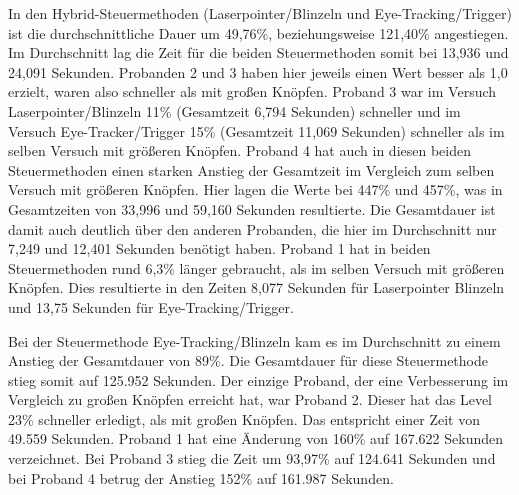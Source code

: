 In den Hybrid-Steuermethoden (Laserpointer/Blinzeln und Eye-Tracking/Trigger) ist die durchschnittliche Dauer um 49,76\%, beziehungsweise 121,40\% angestiegen. Im Durchschnitt lag die Zeit für die beiden Steuermethoden somit bei 13,936  und 24,091 Sekunden. Probanden 2 und 3 haben hier jeweils einen Wert besser als 1,0 erzielt, waren also schneller als mit großen Knöpfen. Proband 3 war im Versuch Laserpointer/Blinzeln 11\% (Gesamtzeit 6,794 Sekunden) schneller und im Versuch Eye-Tracker/Trigger 15\% (Gesamtzeit 11,069 Sekunden) schneller als im selben Versuch mit größeren Knöpfen. Proband 4 hat auch in diesen beiden Steuermethoden einen starken Anstieg der Gesamtzeit im Vergleich zum selben Versuch mit größeren Knöpfen. Hier lagen die Werte bei 447\% und 457\%, was in Gesamtzeiten von 33,996 und 59,160 Sekunden resultierte. Die Gesamtdauer ist damit auch deutlich über den anderen Probanden, die hier im Durchschnitt nur 7,249 und 12,401 Sekunden benötigt haben. Proband 1 hat in beiden Steuermethoden rund 6,3\% länger gebraucht, als im selben Versuch mit größeren Knöpfen. Dies resultierte in den Zeiten 8,077 Sekunden für Laserpointer Blinzeln und 13,75 Sekunden für Eye-Tracking/Trigger.


Bei der Steuermethode Eye-Tracking/Blinzeln kam es im Durchschnitt zu einem Anstieg der Gesamtdauer von 89\%. Die Gesamtdauer für diese Steuermethode stieg somit auf 125.952 Sekunden. Der einzige Proband, der eine Verbesserung im Vergleich zu großen Knöpfen erreicht hat, war Proband 2. Dieser hat das Level 23\% schneller erledigt, als mit großen Knöpfen. Das entspricht einer Zeit von 49.559 Sekunden. Proband 1 hat eine Änderung von 160\% auf 167.622 Sekunden verzeichnet. Bei Proband 3 stieg die Zeit um 93,97\% auf 124.641 Sekunden und bei Proband 4 betrug der Anstieg 152\% auf 161.987 Sekunden. 

